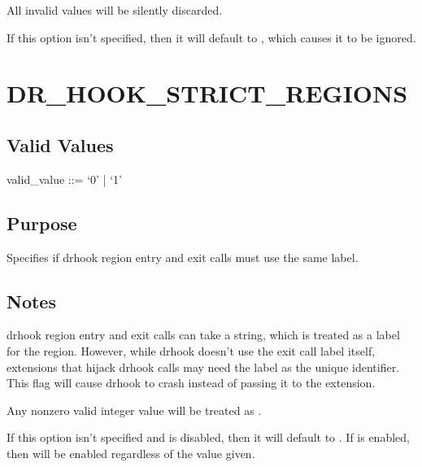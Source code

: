 \documentclass[letterpaper,10pt,english]{sphinxmanual}
\begin{document}
\sphinxAtStartPar
All invalid values will be silently discarded.

\sphinxAtStartPar
If this option isn’t specified, then it will default to , which causes it to be ignored.


\section{DR\_HOOK\_STRICT\_REGIONS}
\label{\detokenize{flag/flag:dr-hook-strict-regions}}\label{\detokenize{flag/flag:id225}}

\subsection{Valid Values}
\label{\detokenize{flag/flag:id226}}
\begin{DUlineblock}{0em}
\item[] valid\_value ::= ‘0’ | ‘1’
\end{DUlineblock}


\subsection{Purpose}
\label{\detokenize{flag/flag:id227}}
\sphinxAtStartPar
Specifies if drhook region entry and exit calls must use the same label.


\subsection{Notes}
\label{\detokenize{flag/flag:id228}}
\sphinxAtStartPar
drhook region entry and exit calls can take a string, which is treated as a label for the region. However, while drhook doesn’t use the exit call label itself, extensions that hijack drhook calls may need the label as the unique identifier. This flag will cause drhook to crash instead of passing it to the extension.

\sphinxAtStartPar
Any non\sphinxhyphen{}zero valid integer value will be treated as .

\sphinxAtStartPar
If this option isn’t specified and {\hyperref[\detokenize{flag/flag:dr-hook-nvtx}]{}} is disabled, then it will default to . If {\hyperref[\detokenize{flag/flag:dr-hook-nvtx}]{}} is enabled, then {\hyperref[\detokenize{flag/flag:dr-hook-strict-regions}]{}} will be enabled regardless of the value given.
\end{document}
